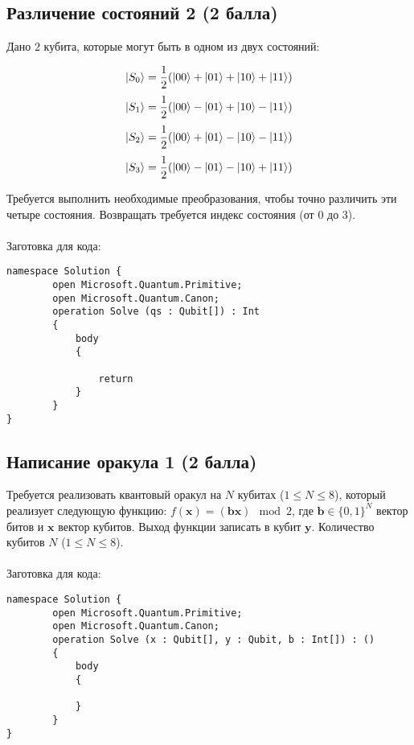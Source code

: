 \documentclass[a4paper,12pt]{article}
\begin{document}
\subsection{Различение состояний 2 (2 балла)}

Дано $2$ кубита, которые могут быть в одном из двух состояний:

$$\Ket{S_0} = \frac{1}{2}(\Ket{00} + \Ket{01} + \Ket{10} + \Ket{11})$$
$$\Ket{S_1} = \frac{1}{2}(\Ket{00} - \Ket{01} + \Ket{10} - \Ket{11})$$
$$\Ket{S_2} = \frac{1}{2}(\Ket{00} + \Ket{01} - \Ket{10} - \Ket{11})$$
$$\Ket{S_3} = \frac{1}{2}(\Ket{00} - \Ket{01} - \Ket{10} + \Ket{11})$$


Требуется выполнить необходимые преобразования, чтобы точно различить эти четыре состояния. Возвращать требуется индекс состояния (от $0$ до $3$). 
\\\\
Заготовка для кода:
\begin{lstlisting}
namespace Solution {
        open Microsoft.Quantum.Primitive;
        open Microsoft.Quantum.Canon;
        operation Solve (qs : Qubit[]) : Int
        {
            body
            {

                return 
            }
        }
}
\end{lstlisting}






\subsection{Написание оракула 1 (2 балла)}

Требуется реализовать квантовый оракул на $N$ кубитах ($1 \le N \le 8$), который реализует следующую функцию: $f(\pmb{x}) = (\pmb{b}\pmb{x}) \mod 2$, где  $\pmb{b} \in \{0,1\}^N$ вектор битов и  $\pmb{x}$ вектор кубитов. Выход функции записать в кубит $\pmb{y}$. Количество кубитов $N$ ($1 \le N \le 8$). 
\\\\
Заготовка для кода:
\begin{lstlisting}
namespace Solution {
        open Microsoft.Quantum.Primitive;
        open Microsoft.Quantum.Canon;
        operation Solve (x : Qubit[], y : Qubit, b : Int[]) : ()
        {
            body
            {

            }
        }
}
\end{lstlisting}
\end{document}
